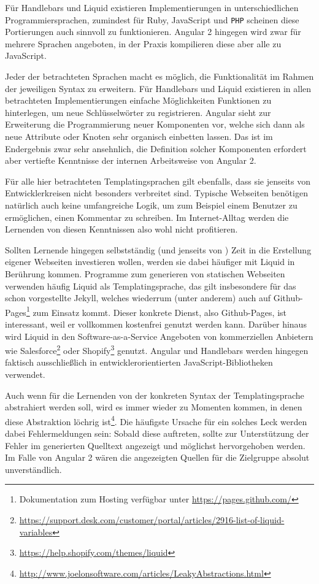 Für Handlebars und Liquid existieren Implementierungen in unterschiedlichen Programmiersprachen, zumindest für Ruby, JavaScript und \texttt{PHP} scheinen diese Portierungen auch sinnvoll zu funktionieren. Angular 2 hingegen wird zwar für mehrere Sprachen angeboten, in der Praxis kompilieren diese aber alle zu JavaScript.

Jeder der betrachteten Sprachen macht es möglich, die Funktionalität im Rahmen der jeweiligen Syntax zu erweitern. Für Handlebars und Liquid existieren in allen betrachteten Implementierungen einfache Möglichkeiten Funktionen zu hinterlegen, um neue Schlüsselwörter zu registrieren. Angular sieht zur Erweiterung die Programmierung neuer Komponenten vor, welche sich dann als neue Attribute oder Knoten sehr organisch einbetten lassen. Das ist im Endergebnis zwar sehr ansehnlich, die Definition solcher Komponenten erfordert aber vertiefte Kenntnisse der internen Arbeitsweise von Angular 2.

Für alle hier betrachteten Templatingsprachen gilt ebenfalls, dass sie jenseits von Entwicklerkreisen nicht besonders verbreitet sind. Typische Webseiten benötigen natürlich auch keine umfangreiche Logik, um zum Beispiel einem Benutzer zu ermöglichen, einen Kommentar zu schreiben. Im Internet-Alltag werden die Lernenden von diesen Kenntnissen also wohl nicht profitieren.

Sollten Lernende hingegen selbstständig (und jenseits von \idename{}) Zeit in die Erstellung eigener Webseiten investieren wollen, werden sie dabei häufiger mit Liquid in Berührung kommen. Programme zum generieren von statischen Webseiten verwenden häufig Liquid als Templatingsprache, das gilt insbesondere für das schon vorgestellte Jekyll, welches wiederrum (unter anderem) auch auf Github-Pages\footnote{Dokumentation zum Hosting verfügbar unter \url{https://pages.github.com/}} zum Einsatz kommt. Dieser konkrete Dienst, also Github-Pages, ist interessant, weil er vollkommen kostenfrei genutzt werden kann. Darüber hinaus wird Liquid in den Software-as-a-Service Angeboten von kommerziellen Anbietern wie Salesforce\footnote{\url{https://support.desk.com/customer/portal/articles/2916-list-of-liquid-variables}} oder Shopify\footnote{\url{https://help.shopify.com/themes/liquid}} genutzt. Angular und Handlebars werden hingegen faktisch ausschließlich in entwicklerorientierten JavaScript-Bibliotheken verwendet.

Auch wenn für die Lernenden von der konkreten Syntax der Templatingsprache abstrahiert werden soll, wird es immer wieder zu Momenten kommen, in denen diese Abstraktion löchrig ist\footnote{\url{http://www.joelonsoftware.com/articles/LeakyAbstractions.html}}. Die häufigste Ursache für ein solches Leck werden dabei Fehlermeldungen sein: Sobald diese auftreten, sollte zur Unterstützung der Fehler im generierten Quelltext angezeigt und möglichst hervorgehoben werden. Im Falle von Angular 2 wären die angezeigten Quellen für die Zielgruppe absolut unverständlich.

